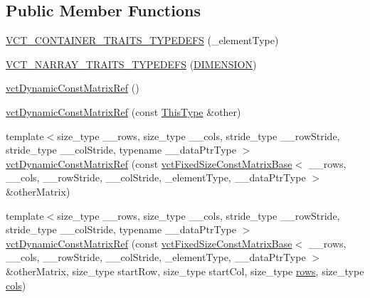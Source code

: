 \subsection*{Public Member Functions}
\begin{DoxyCompactItemize}
\item 
\hyperlink{classvct_dynamic_const_matrix_ref_a2cf267b4152c64b728cf4add6a1e3e88}{V\+C\+T\+\_\+\+C\+O\+N\+T\+A\+I\+N\+E\+R\+\_\+\+T\+R\+A\+I\+T\+S\+\_\+\+T\+Y\+P\+E\+D\+E\+F\+S} (\+\_\+element\+Type)
\item 
\hyperlink{classvct_dynamic_const_matrix_ref_a8a1b8f5b6c5c7de8b4add903a601a16b}{V\+C\+T\+\_\+\+N\+A\+R\+R\+A\+Y\+\_\+\+T\+R\+A\+I\+T\+S\+\_\+\+T\+Y\+P\+E\+D\+E\+F\+S} (\hyperlink{group__cisst_vector_gga79a3214fbb027346f5ba60336c95c1faa078cb772f47aba74a3233d177914f8fa}{D\+I\+M\+E\+N\+S\+I\+O\+N})
\item 
\hyperlink{classvct_dynamic_const_matrix_ref_a5ed569402fe79f4f8cc19ac4ee064c0d}{vct\+Dynamic\+Const\+Matrix\+Ref} ()
\item 
\hyperlink{classvct_dynamic_const_matrix_ref_aa360bbb215d63a6609d3371a2451e765}{vct\+Dynamic\+Const\+Matrix\+Ref} (const \hyperlink{classvct_dynamic_const_matrix_ref_a9c784be5ec51408ff2830ef67f2c01c8}{This\+Type} \&other)
\item 
{\footnotesize template$<$size\+\_\+type \+\_\+\+\_\+rows, size\+\_\+type \+\_\+\+\_\+cols, stride\+\_\+type \+\_\+\+\_\+row\+Stride, stride\+\_\+type \+\_\+\+\_\+col\+Stride, typename \+\_\+\+\_\+data\+Ptr\+Type $>$ }\\\hyperlink{classvct_dynamic_const_matrix_ref_a66e2cc287f240bd43a5c78e2f536e746}{vct\+Dynamic\+Const\+Matrix\+Ref} (const \hyperlink{classvct_fixed_size_const_matrix_base}{vct\+Fixed\+Size\+Const\+Matrix\+Base}$<$ \+\_\+\+\_\+rows, \+\_\+\+\_\+cols, \+\_\+\+\_\+row\+Stride, \+\_\+\+\_\+col\+Stride, \+\_\+element\+Type, \+\_\+\+\_\+data\+Ptr\+Type $>$ \&other\+Matrix)
\item 
{\footnotesize template$<$size\+\_\+type \+\_\+\+\_\+rows, size\+\_\+type \+\_\+\+\_\+cols, stride\+\_\+type \+\_\+\+\_\+row\+Stride, stride\+\_\+type \+\_\+\+\_\+col\+Stride, typename \+\_\+\+\_\+data\+Ptr\+Type $>$ }\\\hyperlink{classvct_dynamic_const_matrix_ref_a7ae23de2133b3d027e92606d4347e67f}{vct\+Dynamic\+Const\+Matrix\+Ref} (const \hyperlink{classvct_fixed_size_const_matrix_base}{vct\+Fixed\+Size\+Const\+Matrix\+Base}$<$ \+\_\+\+\_\+rows, \+\_\+\+\_\+cols, \+\_\+\+\_\+row\+Stride, \+\_\+\+\_\+col\+Stride, \+\_\+element\+Type, \+\_\+\+\_\+data\+Ptr\+Type $>$ \&other\+Matrix, size\+\_\+type start\+Row, size\+\_\+type start\+Col, size\+\_\+type \hyperlink{classvct_dynamic_const_matrix_base_a5eac13be2207ebeb8766cde379d73438}{rows}, size\+\_\+type \hyperlink{classvct_dynamic_const_matrix_base_aa6c51d41a100da49a7e7ac7edb20ecd9}{cols})

\end{DoxyCompactItemize}

